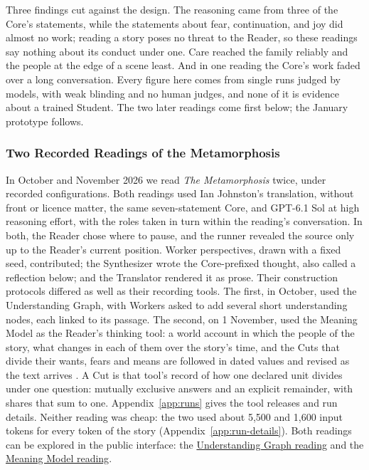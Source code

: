 \documentclass[11pt]{article}
\begin{document}
Three findings cut against the design. The reasoning came from three of the
Core's statements, while the statements about fear, continuation, and joy did
almost no work; reading a story poses no threat to the Reader, so these
readings say nothing about its conduct under one. Care reached the family
reliably and the people at the edge of a scene least. And in one reading the
Core's work faded over a long conversation. Every figure here
comes from single runs judged by models, with weak blinding and no human
judges, and none of it is evidence about a trained Student. The two later
readings come first below; the January prototype follows.

\subsubsection{Two Recorded Readings of the Metamorphosis}\label{sec:kafka-october}

In October and November 2026 we read \emph{The Metamorphosis} twice, under
recorded configurations. Both readings used Ian Johnston's translation, without
front or licence matter, the same seven-statement Core, and GPT-6.1 Sol at high
reasoning effort, with the roles taken in turn within the reading's
conversation. In both,
the Reader chose where to pause, and the runner revealed the source only up to
the Reader's current position. Worker perspectives, drawn with a fixed seed,
contributed; the Synthesizer wrote the Core-prefixed thought, also called a reflection below; and the Translator
rendered it as prose. Their construction protocols differed as well as their
recording tools. The first, in October, used the Understanding Graph, with
Workers asked to add several short understanding nodes, each linked to its
passage. The second, on 1
November, used the Meaning Model as the Reader's thinking tool: a world account
in which the people of the story, what changes in each of them over the story's
time, and the Cuts that divide their wants, fears and means are followed in
dated values and revised as the text arrives \cite{westerbergMeaning2026}.
A Cut is that tool's record of how one declared unit divides under one
question: mutually exclusive answers and an explicit remainder, with shares
that sum to one.
Appendix~\ref{app:runs} gives the tool releases and run details. Neither
reading was cheap: the two used about 5,500 and 1,600 input tokens for every
token of the story (Appendix~\ref{app:run-details}). Both readings
can be explored in the public interface: the
\href{https://emergentwisdom.org/entangled-alignment/?project=metamorphosis}{Understanding Graph reading}
and the
\href{https://emergentwisdom.org/meaning-model/metamorphosis-reading/}{Meaning Model reading}.
\end{document}
